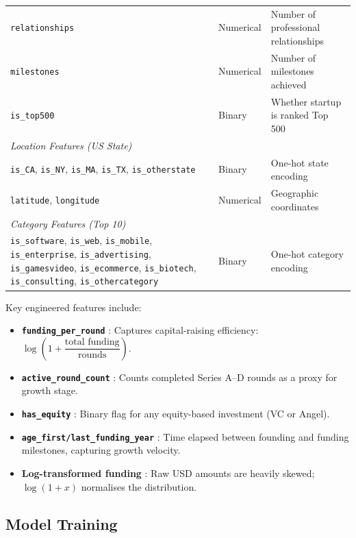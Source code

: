 \documentclass[12pt,a4paper]{article}
\begin{document}
\begin{table}[H]
\begin{tabular}{llp{5.5cm}}
\texttt{relationships}           & Numerical       & Number of professional relationships \\
\texttt{milestones}              & Numerical       & Number of milestones achieved \\
\texttt{is\_top500}              & Binary          & Whether startup is ranked Top 500 \\
\midrule
\multicolumn{3}{l}{\textit{Location Features (US State)}} \\
\texttt{is\_CA}, \texttt{is\_NY}, \texttt{is\_MA}, \texttt{is\_TX}, \texttt{is\_otherstate} & Binary & One-hot state encoding \\
\texttt{latitude}, \texttt{longitude} & Numerical & Geographic coordinates \\
\midrule
\multicolumn{3}{l}{\textit{Category Features (Top 10)}} \\
\texttt{is\_software}, \texttt{is\_web}, \texttt{is\_mobile}, \texttt{is\_enterprise},
\texttt{is\_advertising}, \texttt{is\_gamesvideo}, \texttt{is\_ecommerce},
\texttt{is\_biotech}, \texttt{is\_consulting}, \texttt{is\_othercategory} & Binary & One-hot category encoding \\
\bottomrule
\end{tabular}
\end{table}

Key engineered features include:
\begin{itemize}[leftmargin=1.5em]
    \item \textbf{\texttt{funding\_per\_round}} : Captures capital-raising efficiency:
          $\log\!\left(1 + \dfrac{\text{total funding}}{\text{rounds}}\right)$.
    \item \textbf{\texttt{active\_round\_count}} : Counts completed Series A--D rounds
          as a proxy for growth stage.
    \item \textbf{\texttt{has\_equity}} : Binary flag for any equity-based investment
          (VC or Angel).
    \item \textbf{\texttt{age\_first/last\_funding\_year}} : Time elapsed between
          founding and funding milestones, capturing growth velocity.
    \item \textbf{Log-transformed funding} : Raw USD amounts are heavily skewed;
          $\log(1 + x)$ normalises the distribution.
\end{itemize}

\subsection{Model Training}
\end{document}
